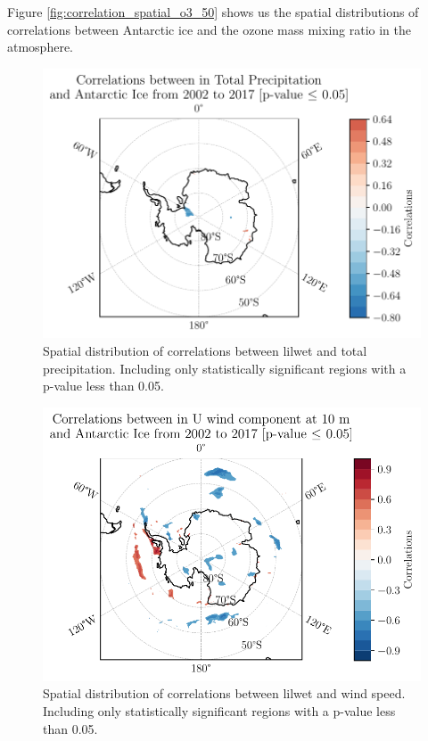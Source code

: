 \documentclass[../main.tex]{subfiles}
\begin{document}
Figure \ref{fig:correlation_spatial_o3_50} shows us the spatial distributions of correlations between Antarctic ice and the ozone mass mixing ratio in the atmosphere.

\begin{figure}[hbt!]
    \centering
    \includegraphics{images/2021w5/chapter7/hres/correlation_spatial_tp}
    \caption{Spatial distribution of correlations between \gls{lilwet} and total precipitation. Including only statistically significant regions with a p-value less than 0.05.}
    \label{fig:my_label}
\end{figure}
\begin{figure}[hbt!]
    \centering
    \includegraphics{images/2021w5/chapter7/hres/correlation_spatial_u_10}
    \caption{Spatial distribution of correlations between \gls{lilwet} and wind speed. Including only statistically significant regions with a p-value less than 0.05.}
    \label{fig:my_label}
\end{figure}
\end{document}
